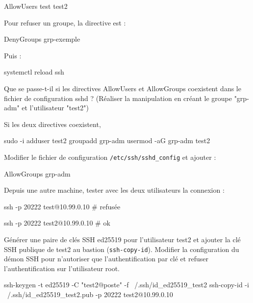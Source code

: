 \documentclass[a4paper,10pt]{exam}
\begin{document}
\begin{questions}
\begin{solution}
\begin{bashcode}
AllowUsers test test2
\end{bashcode}

Pour refuser un groupe, la directive est :

\begin{bashcode}
DenyGroups grp-exemple
\end{bashcode}

Puis :

\begin{bashcode}
systemctl reload ssh
\end{bashcode}

\end{solution}

\question Que se passe-t-il si les directives AllowUsers et AllowGroups
  coexistent dans le fichier de configuration sshd ? (Réaliser la
  manipulation en créant le groupe "grp-adm" et
  l'utilisateur "test2")

\begin{solution}
Si les deux directives coexistent,

\begin{bashcode}
sudo -i
adduser test2
groupadd grp-adm
usermod -aG grp-adm test2
\end{bashcode}

Modifier le fichier de configuration \texttt{/etc/ssh/sshd\_config} et
ajouter :

\begin{bashcode}
AllowGroups grp-adm
\end{bashcode}

Depuis une autre machine, tester avec les deux utilisateurs la connexion
:

\begin{bashcode}
ssh -p 20222 test@10.99.0.10 # refusée
\end{bashcode}

\begin{bashcode}
ssh -p 20222 test2@10.99.0.10 # ok
\end{bashcode}

\end{solution}

\question Générer une paire de clés SSH ed25519 pour
  l'utilisateur test2 et ajouter la clé SSH publique de
  test2 au bastion (\texttt{ssh-copy-id}). Modifier la configuration du
  démon SSH pour n'autoriser que
  l'authentification par clé et refuser
  l'authentification sur l'utilisateur
  root.

\begin{solution}
\begin{bashcode}
ssh-keygen -t ed25519 -C "test2@poste" -f ~/.ssh/id_ed25519_test2
ssh-copy-id -i ~/.ssh/id_ed25519_test2.pub -p 20222 test2@10.99.0.10
\end{bashcode}


\end{solution}
\end{questions}
\end{document}
